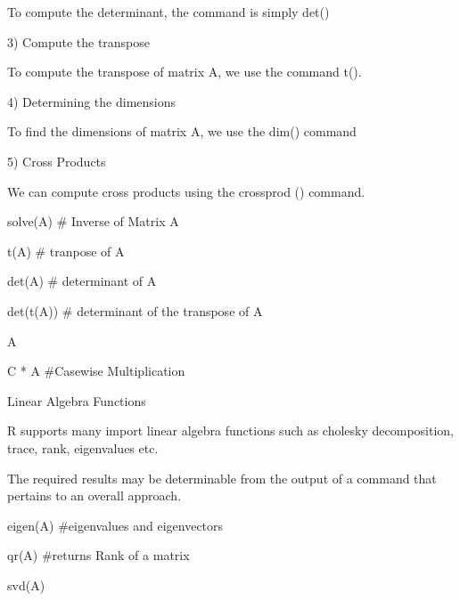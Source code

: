 To compute the determinant, the command is simply det()



3) Compute the transpose 


To compute the transpose of matrix A, we use the command t().



4) Determining the dimensions 


To find the dimensions of matrix A, we use the dim() command


5) Cross Products


We can compute cross products using the crossprod () command. 









solve(A)                            # Inverse of Matrix A    


t(A)                                  # tranpose of A


det(A)                               # determinant of A  


det(t(A))                           # determinant of the transpose of A


A %


C * A                                #Casewise Multiplication
 




 




Linear Algebra Functions


R supports many import linear algebra functions such as cholesky decomposition, trace, rank, eigenvalues etc.


The required results may be determinable from the output of a command that pertains to an overall approach.









eigen(A)       #eigenvalues and eigenvectors       

                                                                      

qr(A)            #returns Rank of a matrix


svd(A)
 




